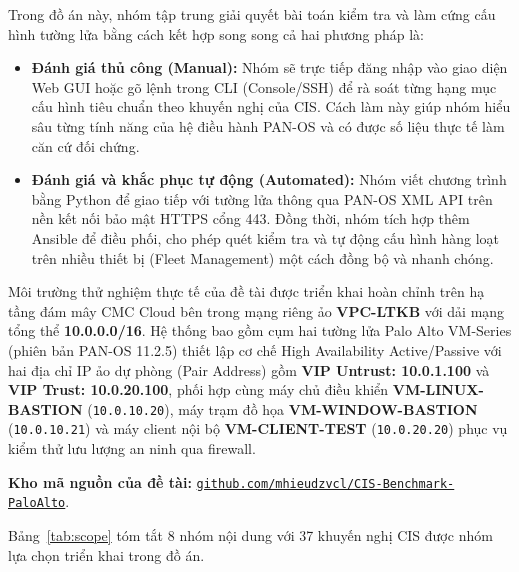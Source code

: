 \documentclass[12pt,a4paper]{article}
\begin{document}
\noindent Trong đồ án này, nhóm tập trung giải quyết bài toán kiểm tra và làm cứng cấu hình tường lửa bằng cách kết hợp song song cả hai phương pháp là:
\begin{itemize}
    \item \textbf{Đánh giá thủ công (Manual):} Nhóm sẽ trực tiếp đăng nhập vào giao diện Web GUI hoặc gõ lệnh trong CLI (Console/SSH) để rà soát từng hạng mục cấu hình tiêu chuẩn theo khuyến nghị của CIS. Cách làm này giúp nhóm hiểu sâu từng tính năng của hệ điều hành PAN-OS và có được số liệu thực tế làm căn cứ đối chứng.
    \item \textbf{Đánh giá và khắc phục tự động (Automated):} Nhóm viết chương trình bằng Python để giao tiếp với tường lửa thông qua PAN-OS XML API trên nền kết nối bảo mật HTTPS cổng 443. Đồng thời, nhóm tích hợp thêm Ansible để điều phối, cho phép quét kiểm tra và tự động cấu hình hàng loạt trên nhiều thiết bị (Fleet Management) một cách đồng bộ và nhanh chóng.
\end{itemize}

\vspace{0.3cm}

\noindent Môi trường thử nghiệm thực tế của đề tài được triển khai hoàn chỉnh trên hạ tầng đám mây CMC Cloud bên trong mạng riêng ảo \textbf{VPC-LTKB} với dải mạng tổng thể \textbf{10.0.0.0/16}. Hệ thống bao gồm cụm hai tường lửa Palo Alto VM-Series (phiên bản PAN-OS 11.2.5) thiết lập cơ chế High Availability Active/Passive với hai địa chỉ IP ảo dự phòng (Pair Address) gồm \textbf{VIP Untrust: 10.0.1.100} và \textbf{VIP Trust: 10.0.20.100}, phối hợp cùng máy chủ điều khiển \textbf{VM-LINUX-BASTION} (\texttt{10.0.10.20}), máy trạm đồ họa \textbf{VM-WINDOW-BASTION} (\texttt{10.0.10.21}) và máy client nội bộ \textbf{VM-CLIENT-TEST} (\texttt{10.0.20.20}) phục vụ kiểm thử lưu lượng an ninh qua firewall.

\vspace{0.3cm}

\noindent\textbf{Kho mã nguồn của đề tài:} \href{https://github.com/mhieudzvcl/CIS-Benchmark-PaloAlto}{\texttt{github.com/mhieudzvcl/CIS-Benchmark-PaloAlto}}.

\vspace{0.3cm}

\noindent Bảng~\ref{tab:scope} tóm tắt 8 nhóm nội dung với 37 khuyến nghị CIS được nhóm lựa chọn triển khai trong đồ án.
\end{document}
